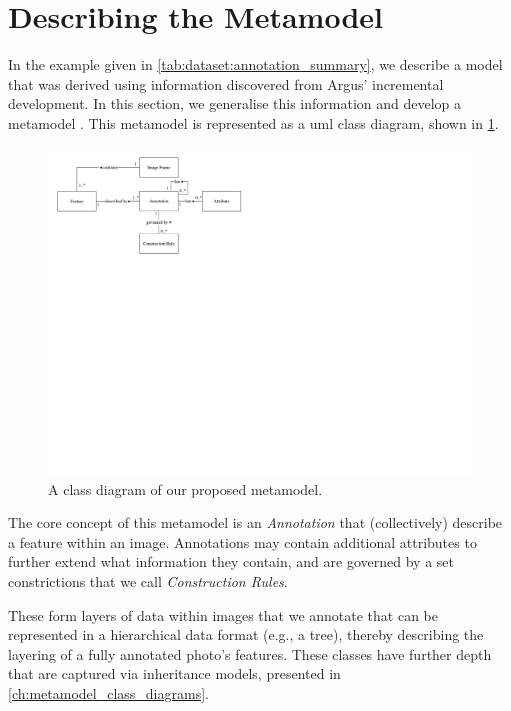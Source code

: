 \section{Describing the Metamodel}
\label{sec:dataset:architecture:metamodel}


In the example given in \cref{tab:dataset:annotation_summary}, we describe a model that was derived using information discovered from Argus' incremental development. In this section, we generalise this information and develop a metamodel . This metamodel is represented as a \gls{uml} class diagram, shown in \cref{fig:dataset:metamodel_class_diagram}.

\begin{figure}[h]
  \centering
  \includegraphics[width=\textwidth]{images/dataset/metamodel_class_diagram}
  \caption[Class diagram of our proposed metamodel]{A class diagram of our proposed metamodel.}
  \label{fig:dataset:metamodel_class_diagram}
\end{figure}

The core concept of this metamodel is an \textit{Annotation} that (collectively) describe a feature within an image. Annotations may contain additional attributes to further extend what information they contain, and are governed by a set constrictions that we call \textit{Construction Rules}.

These form layers of data within images that we annotate that can be represented in a hierarchical data format (e.g., a tree), thereby describing the layering of a fully annotated photo's features. These classes have further depth that are captured via inheritance models, presented in \cref{ch:metamodel_class_diagrams}.

